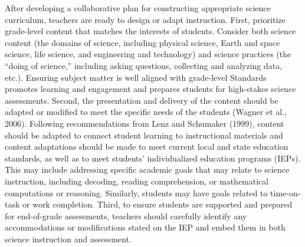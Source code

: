 \documentclass[11.5pt]{sig-alternate} %
\begin{document}
\begin{large}
After developing a collaborative plan for constructing appropriate science curriculum, teachers are ready to design or adapt instruction. First, prioritize grade-level content that matches the interests of students. Consider both science content (the domains of science, including physical science, Earth and space science, life science, and engineering and technology) and science practices (the “doing of science,” including asking questions, collecting and analyzing data, etc.). Ensuring subject matter is well aligned with grade-level Standards promotes learning and engagement and prepares students for high-stakes science assessments. Second, the presentation and delivery of the content should be adapted or modified to meet the specific needs of the students (Wagner et al., 2006). Following recommendations from Lenz and Schumaker (1999), content should be adapted to connect student learning to instructional materials and content adaptations should be made to meet current local and state education standards, as well as to meet students’ individualized education programs (IEPs). This may include addressing specific academic goals that may relate to science instruction, including decoding, reading comprehension, or mathematical computations or reasoning. Similarly, students may have goals related to time-on-task or work completion. Third, to ensure students are supported and prepared for end-of-grade assessments, teachers should carefully identify any accommodations or modifications stated on the IEP and embed them in both science instruction and assessment. 


\end{large}
\end{document}
